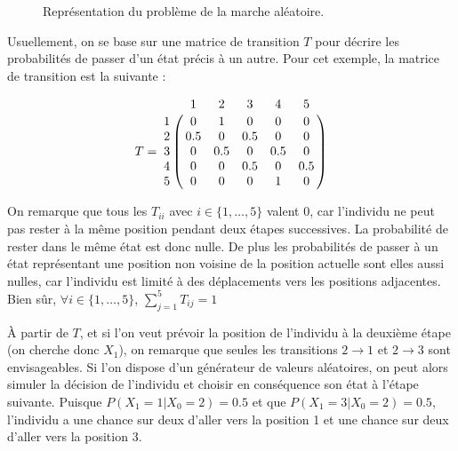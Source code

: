 \documentclass[12pt]{article}
\begin{document}
\begin{figure}[H]
\centering


\caption{Représentation du problème de la marche aléatoire.}

\end{figure}

Usuellement, on se base sur une matrice de transition $T$ pour décrire
les probabilités de passer d'un état précis à un autre. Pour cet
exemple, la matrice de transition est la suivante :

$$
T = \bordermatrix{
    & 1 & 2 & 3 & 4 & 5 \cr
  1 & 0 & 1 & 0 & 0 & 0 \cr
  2 & 0.5 & 0 & 0.5 & 0 & 0 \cr
  3 & 0 & 0.5 & 0 & 0.5 & 0 \cr
  4 & 0 & 0 & 0.5 & 0 & 0.5 \cr
  5 & 0 & 0 & 0 & 1 & 0 \cr
}
$$
\vspace{0.5cm}

On remarque que tous les $T_{ii}$ avec $i \in \{1, \dots, 5\}$ valent
0, car l'individu ne peut pas rester à la même position pendant deux
étapes successives. La probabilité de rester dans le même état est
donc nulle. De plus les probabilités de passer à un état représentant
une position non voisine de la position actuelle sont elles aussi
nulles, car l'individu est limité à des déplacements vers les
positions adjacentes. Bien sûr, $\forall i \in \{1, \dots, 5\}$,
$\sum_{j=1}^5 T_{ij} = 1$

\`A partir de $T$, et si l'on veut prévoir la position de l'individu à
la deuxième étape (on cherche donc $X_1$), on remarque que seules les
transitions $2 \rightarrow 1$ et $2 \rightarrow 3$ sont
envisageables. Si l'on dispose d'un générateur de valeurs aléatoires,
on peut alors simuler la décision de l'individu et choisir en
conséquence son état à l'étape suivante. Puisque $P(X_1 = 1 | X_0 = 2)
= 0.5$ et que $P(X_1 = 3 | X_0 = 2) = 0.5$, l'individu a une chance
sur deux d'aller vers la position 1 et une chance sur deux d'aller
vers la position 3.
\end{document}
